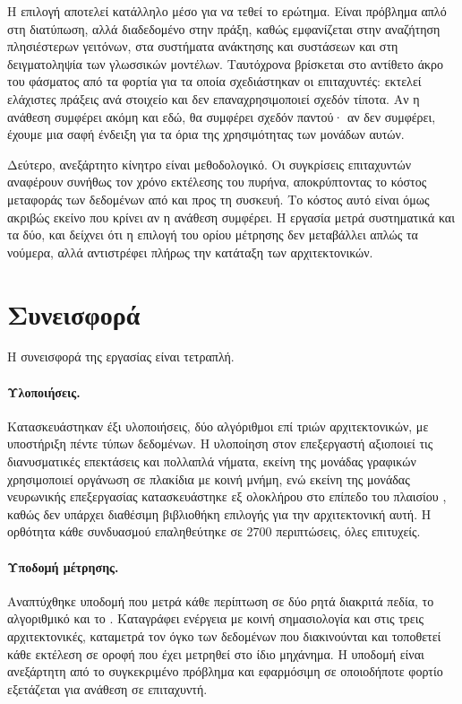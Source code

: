 Η επιλογή  αποτελεί κατάλληλο μέσο για να τεθεί το ερώτημα. Είναι
πρόβλημα απλό στη διατύπωση, αλλά διαδεδομένο στην πράξη, καθώς εμφανίζεται στην
αναζήτηση πλησιέστερων γειτόνων, στα συστήματα ανάκτησης και συστάσεων και στη
δειγματοληψία των γλωσσικών μοντέλων. Ταυτόχρονα βρίσκεται στο αντίθετο άκρο του
φάσματος από τα φορτία για τα οποία σχεδιάστηκαν οι επιταχυντές: εκτελεί
ελάχιστες πράξεις ανά στοιχείο και δεν επαναχρησιμοποιεί σχεδόν τίποτα. Αν η
ανάθεση συμφέρει ακόμη και εδώ, θα συμφέρει σχεδόν παντού· αν δεν συμφέρει,
έχουμε μια σαφή ένδειξη για τα όρια της χρησιμότητας των μονάδων αυτών.

Δεύτερο, ανεξάρτητο κίνητρο είναι μεθοδολογικό. Οι συγκρίσεις επιταχυντών
αναφέρουν συνήθως τον χρόνο εκτέλεσης του πυρήνα, αποκρύπτοντας το κόστος
μεταφοράς των δεδομένων από και προς τη συσκευή. Το κόστος αυτό είναι όμως
ακριβώς εκείνο που κρίνει αν η ανάθεση συμφέρει. Η εργασία μετρά συστηματικά και
τα δύο, και δείχνει ότι η επιλογή του ορίου μέτρησης δεν μεταβάλλει απλώς τα
νούμερα, αλλά αντιστρέφει πλήρως την κατάταξη των αρχιτεκτονικών.

\section{Συνεισφορά}
\label{sec:intro-contribution}

Η συνεισφορά της εργασίας είναι τετραπλή.

\paragraph{Υλοποιήσεις.} Κατασκευάστηκαν έξι υλοποιήσεις, δύο αλγόριθμοι επί
τριών αρχιτεκτονικών, με υποστήριξη πέντε τύπων δεδομένων. Η υλοποίηση στον
επεξεργαστή αξιοποιεί τις διανυσματικές επεκτάσεις  και πολλαπλά
νήματα, εκείνη της μονάδας γραφικών χρησιμοποιεί οργάνωση σε πλακίδια με κοινή
μνήμη, ενώ εκείνη της μονάδας νευρωνικής επεξεργασίας κατασκευάστηκε εξ ολοκλήρου
στο επίπεδο του πλαισίου , καθώς δεν υπάρχει διαθέσιμη βιβλιοθήκη
επιλογής  για την αρχιτεκτονική αυτή. Η ορθότητα κάθε συνδυασμού
επαληθεύτηκε σε 2700 περιπτώσεις, όλες επιτυχείς.

\paragraph{Υποδομή μέτρησης.} Αναπτύχθηκε υποδομή που μετρά κάθε περίπτωση σε δύο
ρητά διακριτά πεδία, το αλγοριθμικό και το . Καταγράφει ενέργεια
με κοινή σημασιολογία και στις τρεις αρχιτεκτονικές, καταμετρά τον όγκο των
δεδομένων που διακινούνται και τοποθετεί κάθε εκτέλεση σε οροφή που έχει
μετρηθεί στο ίδιο μηχάνημα. Η υποδομή είναι ανεξάρτητη από το συγκεκριμένο πρόβλημα 
και εφαρμόσιμη σε οποιοδήποτε φορτίο εξετάζεται για ανάθεση σε επιταχυντή.

